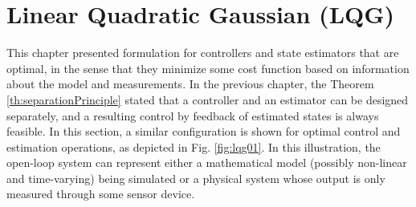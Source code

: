 \documentclass[a4paper,11pt]{book}
\numberwithin{figure}{chapter}
\numberwithin{equation}{chapter}
\numberwithin{table}{chapter}
\theoremstyle{definition}
\begin{document}
\section{Linear Quadratic Gaussian (LQG)}

This chapter presented formulation for controllers and state estimators that are optimal, in the sense that they minimize some cost function based on information about the model and measurements. In the previous chapter, the Theorem \ref{th:separationPrinciple} stated that a controller and an estimator can be designed separately, and a resulting control by feedback of estimated states is always feasible. In this section, a similar configuration is shown for optimal control and estimation operations, as depicted in Fig. \ref{fig:lqg01}. In this illustration, the open-loop system can represent either a mathematical model (possibly non-linear and time-varying) being simulated or a physical system whose output is only measured through some sensor device. 
\end{document}
